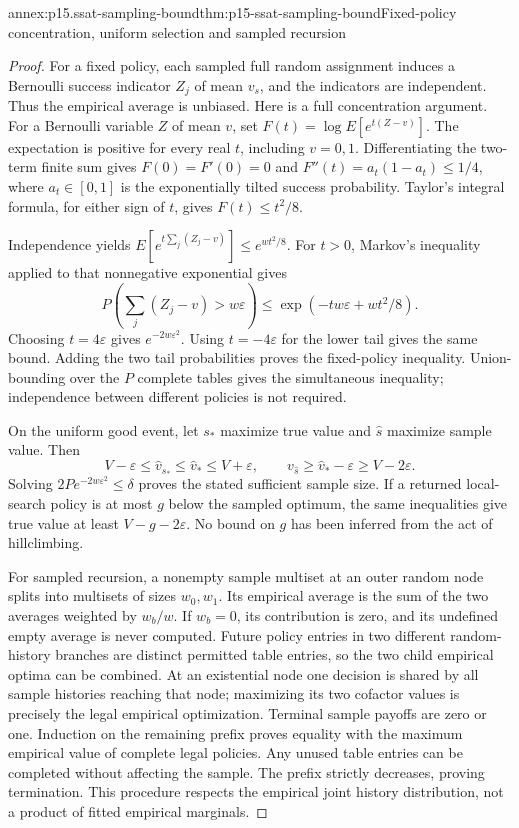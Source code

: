 \begin{annexitem}{annex:p15.ssat-sampling-bound}{thm:p15-ssat-sampling-bound}{Fixed-policy concentration, uniform selection and sampled recursion}
\begin{proof}
For a fixed policy, each sampled full random assignment induces a
Bernoulli success indicator \(Z_j\) of mean \(v_s\), and the
indicators are independent. Thus the empirical average is unbiased.
Here is a full concentration argument. For a Bernoulli variable \(Z\)
of mean \(v\), set \(F(t)=\log E[e^{t(Z-v)}]\).
The expectation is positive for every real \(t\), including \(v=0,1\).
Differentiating the two-term finite sum gives \(F(0)=F'(0)=0\)
and \(F''(t)=a_t(1-a_t)\leq1/4\), where \(a_t\in[0,1]\)
is the exponentially tilted success probability. Taylor's integral
formula, for either sign of \(t\), gives \(F(t)\leq t^2/8\).

Independence yields
\(E[e^{t\sum_j(Z_j-v)}]\leq e^{wt^2/8}\).
For \(t>0\), Markov's inequality applied to that nonnegative
exponential gives
\[
 P\!\left(\sum_j(Z_j-v)>w\varepsilon\right)
 \leq \exp(-tw\varepsilon+wt^2/8).
\]
Choosing \(t=4\varepsilon\) gives \(e^{-2w\varepsilon^2}\).
Using \(t=-4\varepsilon\) for the lower tail gives the same bound.
Adding the two tail probabilities proves the fixed-policy inequality.
Union-bounding over the \(P\) complete tables gives the simultaneous
inequality; independence between different policies is not required.

On the uniform good event, let \(s_*\) maximize true value and
\(\widehat s\) maximize sample value. Then
\[
 V-\varepsilon\leq\widehat v_{s_*}
   \leq\widehat v_*\leq V+\varepsilon,
 \qquad
 v_{\widehat s}\geq\widehat v_* -\varepsilon\geq V-2\varepsilon.
\]
Solving \(2Pe^{-2w\varepsilon^2}\leq\delta\) proves the stated
sufficient sample size. If a returned local-search policy is at most
\(g\) below the sampled optimum, the same inequalities give true
value at least \(V-g-2\varepsilon\). No bound on \(g\) has
been inferred from the act of hillclimbing.

For sampled recursion, a nonempty sample multiset at an outer random
node splits into multisets of sizes \(w_0,w_1\). Its empirical
average is the sum of the two averages weighted by \(w_b/w\).
If \(w_b=0\), its contribution is zero, and its undefined empty
average is never computed. Future policy entries in two different
random-history branches are distinct permitted table entries, so the
two child empirical optima can be combined. At an existential node
one decision is shared by all sample histories reaching that node;
maximizing its two cofactor values is precisely the legal empirical
optimization. Terminal sample payoffs are zero or one. Induction on
the remaining prefix proves equality with the maximum empirical
value of complete legal policies. Any unused table entries can be
completed without affecting the sample. The prefix strictly decreases,
proving termination. This procedure respects the empirical joint
history distribution, not a product of fitted empirical marginals.
\end{proof}
\end{annexitem}

